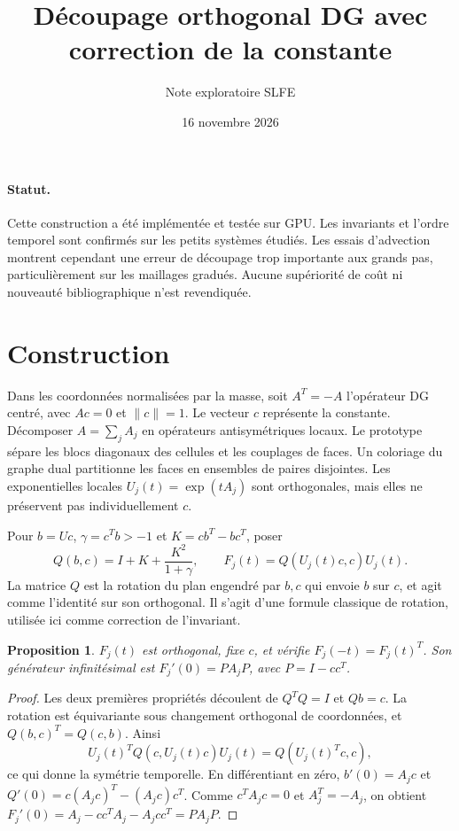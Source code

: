 \documentclass[11pt,a4paper]{article}
\title{Découpage orthogonal DG avec correction de la constante}
\author{Note exploratoire SLFE}\date{16 novembre 2026}
\newtheorem{proposition}{Proposition}
\begin{document}
\maketitle
\paragraph{Statut.} Cette construction a été implémentée et testée sur GPU.
Les invariants et l'ordre temporel sont confirmés sur les petits systèmes
étudiés. Les essais d'advection montrent cependant une erreur de découpage
trop importante aux grands pas, particulièrement sur les maillages gradués.
Aucune supériorité de coût ni nouveauté bibliographique n'est revendiquée.

\section{Construction}
Dans les coordonnées normalisées par la masse, soit $A^T=-A$ l'opérateur DG
centré, avec $Ac=0$ et $\|c\|=1$. Le vecteur $c$ représente la constante.
Décomposer $A=\sum_j A_j$ en opérateurs antisymétriques locaux. Le prototype
sépare les blocs diagonaux des cellules et les couplages de faces. Un coloriage
du graphe dual partitionne les faces en ensembles de paires disjointes.
Les exponentielles locales $U_j(t)=\exp(tA_j)$ sont orthogonales, mais elles
ne préservent pas individuellement $c$.

Pour $b=Uc$, $\gamma=c^Tb>-1$ et $K=cb^T-bc^T$, poser
\[
 Q(b,c)=I+K+\frac{K^2}{1+\gamma},\qquad F_j(t)=Q(U_j(t)c,c)U_j(t).
\]
La matrice $Q$ est la rotation du plan engendré par $b,c$ qui envoie $b$ sur
$c$, et agit comme l'identité sur son orthogonal. Il s'agit d'une formule
classique de rotation, utilisée ici comme correction de l'invariant.

\begin{proposition}
$F_j(t)$ est orthogonal, fixe $c$, et vérifie
$F_j(-t)=F_j(t)^T$. Son générateur infinitésimal est
$F_j'(0)=P A_j P$, avec $P=I-cc^T$.
\end{proposition}
\begin{proof}
Les deux premières propriétés découlent de $Q^TQ=I$ et $Qb=c$.
La rotation est équivariante sous changement orthogonal de coordonnées,
et $Q(b,c)^T=Q(c,b)$. Ainsi
\[
 U_j(t)^T Q(c,U_j(t)c)U_j(t)=Q(U_j(t)^Tc,c),
\]
ce qui donne la symétrie temporelle.
En différentiant en zéro, $b'(0)=A_jc$ et
$Q'(0)=c(A_jc)^T-(A_jc)c^T$.
Comme $c^TA_jc=0$ et $A_j^T=-A_j$, on obtient
$F_j'(0)=A_j-cc^TA_j-A_jcc^T=P A_j P$.
\end{proof}
\end{document}
